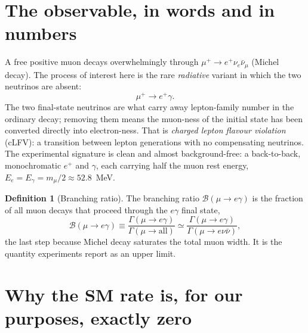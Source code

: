 \documentclass[11pt]{article}
\newcommand{\BR}{\mathcal{B}}
\theoremstyle{definition}
\newtheorem{definition}{Definition}
\begin{document}
\section{The observable, in words and in numbers}
\label{sec:observable}

A free positive muon decays overwhelmingly through $\mu^+\to e^+\nu_e\bar\nu_\mu$
(Michel decay). The process of interest here is the rare \emph{radiative}
variant in which the two neutrinos are absent:
\begin{equation}
\mu^+ \to e^+ \gamma .
\end{equation}
The two final-state neutrinos are what carry away lepton-family number in the
ordinary decay; removing them means the muon-ness of the initial state has been
converted directly into electron-ness. That is \emph{charged lepton flavour
violation} (cLFV): a transition between lepton generations with no compensating
neutrinos. The experimental signature is clean and almost background-free: a
back-to-back, monochromatic $e^+$ and $\gamma$, each carrying half the muon rest
energy, $E_e = E_\gamma = m_\mu/2 \approx 52.8$~MeV.

\begin{definition}[Branching ratio]
The branching ratio $\BR(\mu\to e\gamma)$ is the fraction of all muon decays that
proceed through the $e\gamma$ final state,
\[
\BR(\mu\to e\gamma) \equiv \frac{\Gamma(\mu\to e\gamma)}{\Gamma(\mu\to\text{all})}
   \simeq \frac{\Gamma(\mu\to e\gamma)}{\Gamma(\mu\to e\nu\bar\nu)},
\]
the last step because Michel decay saturates the total muon width. It is the
quantity experiments report as an upper limit.
\end{definition}

\section{Why the SM rate is, for our purposes, exactly zero}
\label{sec:smrate}
\end{document}
